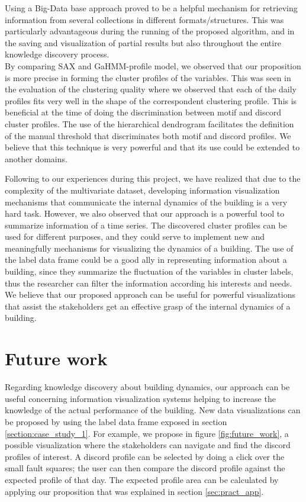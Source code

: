 Using a Big-Data base approach proved to be a helpful mechanism for retrieving information from several collections in different formats/structures. This was particularly advantageous during the running of the proposed algorithm, and in the saving and visualization of partial results but also throughout the entire knowledge discovery process.    \\


By comparing SAX and GaHMM-profile model, we observed that our proposition is more precise in forming the cluster profiles of the variables. This was seen in the evaluation of the clustering quality where we observed that each of the daily profiles fits very well in the shape of the correspondent clustering profile. This is beneficial at the time of doing the discrimination between motif and discord cluster profiles. The use of the hierarchical dendrogram facilitates the definition of the manual threshold that discriminates both motif and discord profiles. We believe that this technique is very powerful and that its use could be extended to another domains.   

Following to our experiences during this project, we have realized that due to the complexity of the multivariate dataset, developing information visualization mechanisms that communicate the internal dynamics of the building is a very hard task. However, we also observed that our approach is a powerful tool to summarize information of a time series. The discovered cluster profiles can be used for different purposes, and they could serve to implement new and meaningfully mechanisms for visualizing the dynamics of a building. The use of the label data frame could be a good ally in representing information about a building, since they summarize the fluctuation of the variables in cluster labels, thus the researcher can filter the information according his interests and needs. We believe that our proposed approach can be useful for powerful visualizations that assist the stakeholders get an effective grasp of the internal dynamics of a building.   



\section{Future work}
\label{future}

Regarding knowledge discovery about building dynamics, our approach can be useful concerning information visualization systems helping to increase the knowledge of the actual performance of the building. New data visualizations can be proposed by using the label data frame exposed in section \ref{section:case_study_1}. For example, we propose in figure \ref{fig:future_work}, a possible visualization where the stakeholders can navigate and find the discord profiles of interest. A discord profile can be selected by doing a click over the small fault squares; the user can then compare the discord profile against the expected profile of that day. The expected profile area can be calculated by applying our proposition that was explained in section \ref{sec:pract_app}.      


